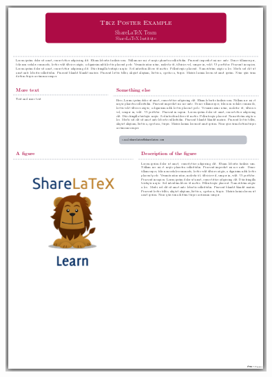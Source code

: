 \documentclass[25pt, a0paper, portrait]{tikzposter}
\begin{document}
\begin{columns}
{\begin{tikzfigure}
	    \includegraphics[width=\linewidth]{Tikzposter_theme/Simple}
	\end{tikzfigure}
    }
\end{columns}
\end{document}
